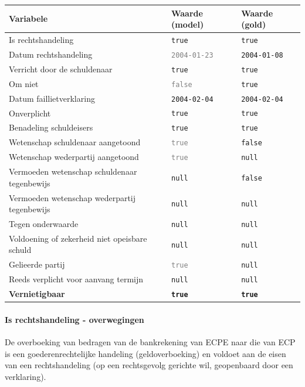 \documentclass[
  dutch,
  a4paper,
]{article}
\begin{document}
\begin{center}
\small
\begin{tabular}{@{}p{7.4cm}p{2.6cm}p{2.6cm}@{}}
\toprule
Variabele & Waarde (model) & Waarde (gold) \\
\midrule
Is rechtshandeling & \texttt{true} & \texttt{true} \\
Datum rechtshandeling & \textcolor{gray}{\texttt{2004-01-23}} & \texttt{2004-01-08} \\
Verricht door de schuldenaar & \texttt{true} & \texttt{true} \\
Om niet & \textcolor{gray}{\texttt{false}} & \texttt{true} \\
Datum faillietverklaring & \texttt{2004-02-04} & \texttt{2004-02-04} \\
Onverplicht & \texttt{true} & \texttt{true} \\
Benadeling schuldeisers & \texttt{true} & \texttt{true} \\
Wetenschap schuldenaar aangetoond & \textcolor{gray}{\texttt{true}} & \texttt{false} \\
Wetenschap wederpartij aangetoond & \textcolor{gray}{\texttt{true}} & \texttt{null} \\
Vermoeden wetenschap schuldenaar tegenbewijs & \texttt{null} & \texttt{false} \\
Vermoeden wetenschap wederpartij tegenbewijs & \texttt{null} & \texttt{null} \\
Tegen onderwaarde & \texttt{null} & \texttt{null} \\
Voldoening of zekerheid niet opeisbare schuld & \texttt{null} & \texttt{null} \\
Gelieerde partij & \textcolor{gray}{\texttt{true}} & \texttt{null} \\
Reeds verplicht voor aanvang termijn & \texttt{null} & \texttt{null} \\
\textbf{Vernietigbaar} & \textbf{\texttt{true}} & \textbf{\texttt{true}} \\
\bottomrule
\end{tabular}
\end{center}

\paragraph{Is rechtshandeling - overwegingen}\label{is-rechtshandeling---overwegingen-51}

De overboeking van bedragen van de bankrekening van ECPE naar die van ECP is een goederenrechtelijke handeling (geldoverboeking) en voldoet aan de eisen van een rechtshandeling (op een rechtsgevolg gerichte wil, geopenbaard door een verklaring).
\end{document}
